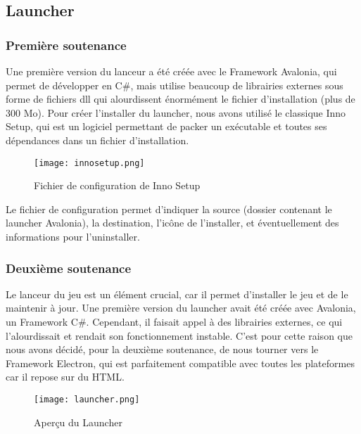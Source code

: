 \subsection{Launcher}


    \subsubsection{Première soutenance}

        Une première version du lanceur a été créée avec le Framework Avalonia, qui permet de développer 
        en C\#, mais utilise beaucoup de librairies externes sous forme de fichiers dll qui alourdissent 
        énormément le fichier d'installation (plus de 300 Mo). Pour créer l'installer du launcher, nous 
        avons utilisé le classique Inno Setup, qui est un logiciel permettant de packer un exécutable et 
        toutes ses dépendances dans un fichier d'installation. 

        \begin{figure}[hbt!]
            \centering
            \texttt{[image: innosetup.png]}
            \caption{Fichier de configuration de Inno Setup}
        \end{figure}

        Le fichier de configuration permet d'indiquer la source (dossier contenant le launcher Avalonia), la destination, 
        l'icône de l'installer, et éventuellement des informations pour l'uninstaller.


    \subsubsection{Deuxième soutenance}

        Le lanceur du jeu est un élément crucial, car il permet d'installer 
        le jeu et de le maintenir à jour. Une première version du launcher avait 
        été créée avec Avalonia, un Framework C\#. Cependant, il faisait appel à des 
        librairies externes, ce qui l'alourdissait et rendait son fonctionnement instable. 
        C'est pour cette raison que nous avons décidé, pour la deuxième soutenance, de nous 
        tourner vers le Framework Electron, qui est parfaitement compatible avec toutes les 
        plateformes car il repose sur du HTML.

        \begin{figure}[hbt!]
            \centering
            \texttt{[image: launcher.png]}
            \caption{Aperçu du Launcher}
        \end{figure}
        \FloatBarrier


